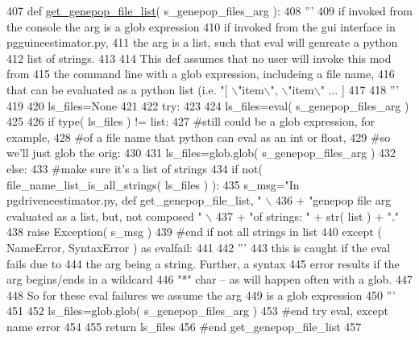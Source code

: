 \begin{DoxyCode}
407 \textcolor{keyword}{def }\hyperlink{namespacenegui_1_1pgdriveneestimator_a15b09d2967ec4812353b0e146f074799}{get\_genepop\_file\_list}( s\_genepop\_files\_arg ):
408     \textcolor{stringliteral}{'''}
409 \textcolor{stringliteral}{    if invoked from the console the arg is a glob expression}
410 \textcolor{stringliteral}{    if invoked from the gui interface in pgguineestimator.py,}
411 \textcolor{stringliteral}{    the arg is a list, such that eval will genreate a python}
412 \textcolor{stringliteral}{    list of strings.}
413 \textcolor{stringliteral}{}
414 \textcolor{stringliteral}{    This def assumes that no user will invoke this mod from }
415 \textcolor{stringliteral}{    the command line with a glob expression, includeing a file name,}
416 \textcolor{stringliteral}{    that can be evaluated as a python list (i.e. "[ \(\backslash\)"item\(\backslash\)", \(\backslash\)"item\(\backslash\)" ... ]}
417 \textcolor{stringliteral}{    }
418 \textcolor{stringliteral}{    '''}
419 
420     ls\_files=\textcolor{keywordtype}{None}
421 
422     \textcolor{keywordflow}{try}:
423 
424         ls\_files=eval( s\_genepop\_files\_arg )
425 
426         \textcolor{keywordflow}{if} type( ls\_files ) != list:
427             \textcolor{comment}{#still could be a glob expression, for example,}
428             \textcolor{comment}{#of a file name that python can eval as an int or float,}
429             \textcolor{comment}{#so we'll just glob the orig:}
430 
431             ls\_files=glob.glob( s\_genepop\_files\_arg )
432         \textcolor{keywordflow}{else}:
433             \textcolor{comment}{#make sure it's a list of strings}
434             \textcolor{keywordflow}{if} not( file\_name\_list\_is\_all\_strings( ls\_files ) ):
435                 s\_msg=\textcolor{stringliteral}{"In pgdriveneestimator.py, def get\_genepop\_file\_list, "} \(\backslash\)
436                         + \textcolor{stringliteral}{"genepop file arg evaluated as a list, but, not composed "} \(\backslash\)
437                         + \textcolor{stringliteral}{"of strings: "} + str( list ) + \textcolor{stringliteral}{"."}
438                 \textcolor{keywordflow}{raise} Exception( s\_msg )
439             \textcolor{comment}{#end if not all strings in list}
440     \textcolor{keywordflow}{except} ( NameError, SyntaxError ) \textcolor{keyword}{as} evalfail:
441 
442         \textcolor{stringliteral}{'''}
443 \textcolor{stringliteral}{        this is caught if the eval fails due to }
444 \textcolor{stringliteral}{        the arg being a string.  Further, a syntax}
445 \textcolor{stringliteral}{        error results if the arg begins/ends in a wildcard}
446 \textcolor{stringliteral}{        "*" char -- as will happen often with a glob.}
447 \textcolor{stringliteral}{}
448 \textcolor{stringliteral}{        So for these eval failures we assume the arg }
449 \textcolor{stringliteral}{        is a glob expression}
450 \textcolor{stringliteral}{        '''}
451 
452         ls\_files=glob.glob( s\_genepop\_files\_arg )
453     \textcolor{comment}{#end try eval, except name error}
454 
455     \textcolor{keywordflow}{return} ls\_files
456 \textcolor{comment}{#end get\_genepop\_file\_list}
457 
\end{DoxyCode}
